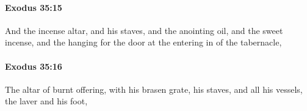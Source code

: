 		\paragraph{Exodus 35:15} %
			\label{EXODUS-35-15}

			And the incense altar, and his staves, and the anointing oil, and the sweet incense, and the hanging for the door at the entering in of the tabernacle,


		\paragraph{Exodus 35:16} %
			\label{EXODUS-35-16}

			The altar of burnt offering, with his brasen grate, his staves, and all his vessels, the laver and his foot,



